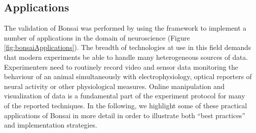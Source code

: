 \subsection{Applications}

The validation of Bonsai was performed by using the framework to implement a number of applications in the domain of neuroscience (Figure \ref{fig:bonsaiApplications}). The breadth of technologies at use in this field demands that modern experiments be able to handle many heterogeneous sources of data. Experimenters need to routinely record video and sensor data monitoring the behaviour of an animal simultaneously with electrophysiology, optical reporters of neural activity or other physiological measures. Online manipulation and visualization of data is a fundamental part of the experiment protocol for many of the reported techniques. In the following, we highlight some of these practical applications of Bonsai in more detail in order to illustrate both “best practices” and implementation strategies.

